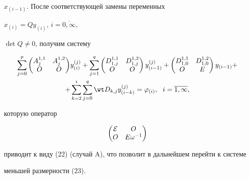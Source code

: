 \begin{pf}
$x_{(i-1)}$. После соответствующей замены переменных


$x_{(i)}=Qy_{(i)}$, $i=\overline{0, \infty}$,


$\det Q \ne 0$, получим систему 


\begin{multline}


\sum_{j=0}^{p}{


{\begin{pmatrix}


 A_j^{1,1} & A_j^{1,2} \\  O & O


\end{pmatrix}}


y_{(i)}^{(j)}}+


\sum_{j=1}^{q}{\begin{pmatrix}


 D_{1,j}^{1,1} & D_{1,j}^{1,2} \\  O & O 


\end{pmatrix}


y_{(i-1)}^{(j)}}+


\begin{pmatrix}


 D_{1,0}^{1,1} & D_{1,0}^{1,2} \\  O & E 


\end{pmatrix}


y_{(i-1)}+ \\


%


+ \sum_{k=2}^{i}{


\sum_{j=0}^{q}{ \wt D_{k,j} 


y_{(i-k)}^{(j)}}}=\varphi_{(i)}, 


\ \ i=\overline{1,\infty },


\end{multline}


которую оператор 


$$


\begin{pmatrix}


 \cal E & O \\  O & E\omega^{-1}


\end{pmatrix}


$$


приводит к виду (22) (случай A), что позволит в дальнейшем перейти к системе


меньшей размерности (23).






\end{pf}
